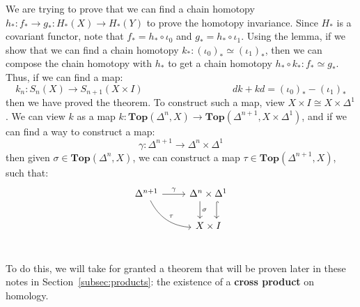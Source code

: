 \documentclass[11pt, oneside]{amsart}   	%
\theoremstyle{definition}
\begin{document}
We are trying to prove that we can find a chain homotopy $h_* : f_*\rightarrow g_* : H_*(X)\rightarrow H_*(Y)$ to prove the 
homotopy invariance. Since $H_*$ is a covariant functor, note that $f_* = h_*\circ\iota_0$ and $g_* = h_*\circ\iota_1$. 
Using the lemma, if we show that we can find a chain homotopy $k_* : (\iota_0)_*\simeq (\iota_1)_*$, then we can 
compose the chain homotopy with $h_*$ to get a chain homotopy $h_*\circ k_* : f_*\simeq g_*$. Thus, if we can 
find a map:
\begin{equation}
	k_n : S_n(X)\rightarrow S_{n + 1}(X\times I)\;\;\;\;\;\;\;\;\;\;\;\;\;\;\;\;\;\;\;\;\;\;\;\;\;\;\;\;\;\;\;\;\; dk + kd = (\iota_0)_* - (\iota_1)_*
\end{equation}
then we have proved the theorem. To construct such a map, view $X\times I\cong X\times\Delta^1$. We can view $k$ as  
a map $k : \textbf{Top}(\Delta^n, X)\rightarrow \textbf{Top}(\Delta^{n + 1}, X\times\Delta^1)$, and if we can find a way to 
construct a map:
\begin{equation}
	\gamma : \Delta^{n + 1}\rightarrow\Delta^n\times\Delta^1
\end{equation}
then given $\sigma\in\textbf{Top}(\Delta^n, X)$, we can construct a map $\tau\in\textbf{Top}(\Delta^{n + 1}, X)$, such that:
\[\begin{tikzcd}
	\Delta^{n + 1}\arrow[r, "\gamma"] \arrow[dr, "\tau", bend right] & \Delta^n\times\Delta^1 
	\arrow[d, shift right=2ex, "\sigma"] \arrow[d, shift 
	left = 2ex, hook] \\
	& X\times I \\
\end{tikzcd}\]

To do this, we will take for granted a theorem that will be proven later in these notes in Section~\ref{subsec:products}: the 
existence of a \textbf{cross product} on homology. 
\end{document}

